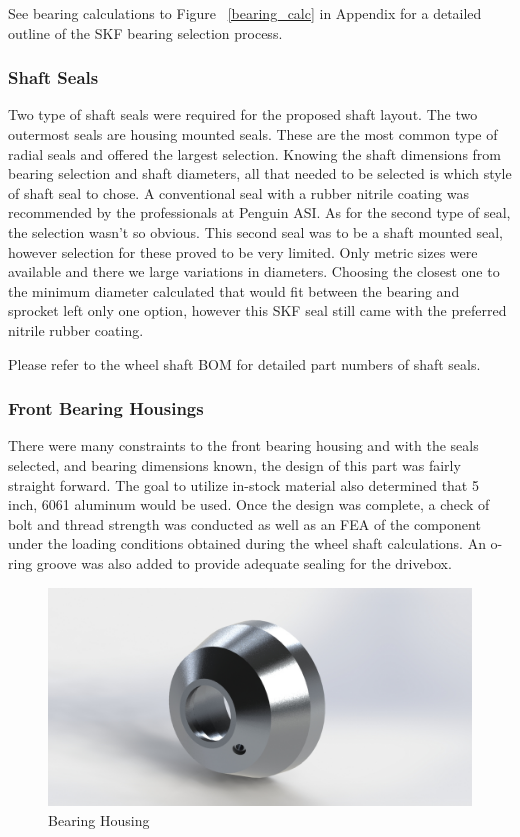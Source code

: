 See bearing calculations to Figure ~\ref{bearing_calc} in Appendix for a detailed outline of the SKF bearing selection process.
\\


\subsubsection{Shaft Seals}
Two type of shaft seals were required for the proposed shaft layout. The two outermost seals are housing mounted seals. These are the most common type of radial seals and offered the largest selection. Knowing the shaft dimensions from bearing selection and shaft diameters, all that needed to be selected is which style of shaft seal to chose. A conventional seal with a rubber nitrile coating was recommended by the professionals at Penguin ASI. As for the second type of seal, the selection wasn't so obvious. This second seal was to be a shaft mounted seal, however selection for these proved to be very limited. Only metric sizes were available and there we large variations in diameters. Choosing the closest one to the minimum diameter calculated that would fit between the bearing and sprocket left only one option, however this SKF seal still came with the preferred nitrile rubber coating.

Please refer to the wheel shaft BOM for detailed part numbers of shaft seals.

\subsubsection{Front Bearing Housings}
There were many constraints to the front bearing housing and with the seals selected, and bearing dimensions known, the design of this part was fairly straight forward. The goal to utilize in-stock material also determined that 5 inch, 6061 aluminum would be used. Once the design was complete, a check of bolt and thread strength was conducted as well as an FEA of the component under the loading conditions obtained during the wheel shaft calculations. An o-ring groove was also added to provide adequate sealing for the drivebox.

\begin{figure}[h]\centering
	\includegraphics[width=.7\linewidth]{dom/hub_iso_rndr.jpg}
	\caption{Bearing Housing}
	\label{fig:housing}
\end{figure}

